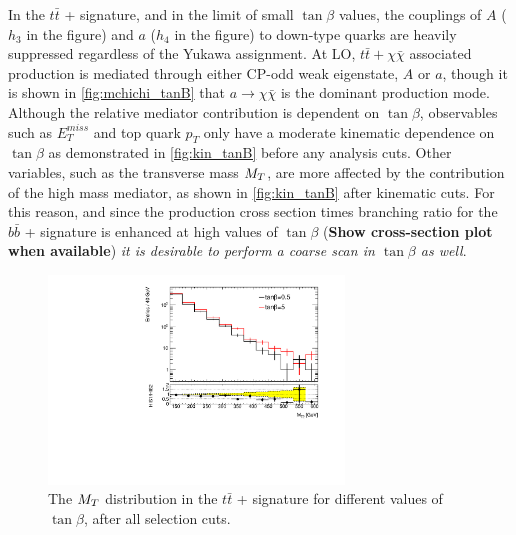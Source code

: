 In the $t\bar{t}$ + \MET signature, and in the limit of small $\tan\beta$ values, the couplings of $A$ ($h_{3}$ in the figure) and $a$ ($h_{4}$ in the figure) to down-type quarks are heavily suppressed regardless of the Yukawa assignment. At LO, $t\bar{t}+\chi\bar{\chi}$ associated production is mediated through either CP-odd weak eigenstate, $A$ or $a$, though it is shown in \autoref{fig:mchichi_tanB} that $a\rightarrow\chi\bar{\chi}$ is the dominant production mode. 
Although the relative mediator contribution is dependent on $\tan\beta$, observables such as $E_{T}^{miss}$ and top quark $p_{T}$ only have a moderate kinematic dependence on $\tan\beta$ as demonstrated in \autoref{fig:kin_tanB} before any analysis cuts. 
Other variables, such as the transverse mass $M_{T}$, are more affected by the contribution of the high mass mediator, as shown in \autoref{fig:kin_tanB} after kinematic cuts. 
For this reason, and since the production cross section times branching ratio for the $b\bar{b}$ + \MET signature is enhanced at high values of $\tan\beta$ (\textbf{Show cross-section plot when available}) \emph{it is desirable to perform a coarse scan in $\tan\beta$ as well}.  

\begin{figure}[tbp]
\centering
\includegraphics[width = 0.7\textwidth]{texinputs/04_grid/figures/DMHF/mt2plot_comparisonTanBeta.pdf}
  \caption{The $M_{T}$ distribution in the $t\bar{t}$ + \MET signature for different values of $\tan\beta$, after all selection cuts.\label{fig:kin_tanB_afterCuts}}
\end{figure}

